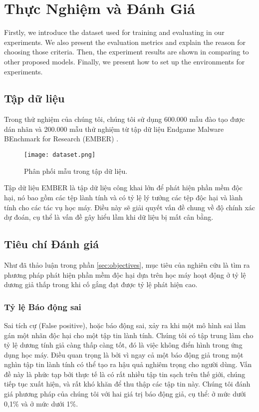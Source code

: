 \chapter{Thực Nghiệm và Đánh Giá}
\graphicspath{{Chapter5/Figs/}}

\begin{chapabstract}
Firstly, we introduce the dataset used for training and evaluating in our experiments. We also present the evaluation metrics and explain the reason for choosing those criteria. Then, the experiment results are shown in comparing to other proposed models. Finally, we present how to set up the environments for experiments.
\end{chapabstract}

\section{Tập dữ liệu}
\label{sec:dataset}

Trong thử nghiệm của chúng tôi, chúng tôi sử dụng 600.000 mẫu đào tạo được dán nhãn và 200.000 mẫu thử nghiệm từ tập dữ liệu Endgame Malware BEnchmark for Research (EMBER) \cite{anderson2018ember}.

\begin{figure}[H] 
\centering
\texttt{[image: dataset.png]}
\caption{Phân phối mẫu trong tập dữ liệu.}
\label{fig:ember}
\end{figure}
 
Tập dữ liệu EMBER là tập dữ liệu công khai lớn để phát hiện phần mềm độc hại, nó bao gồm các tệp lành tính và có tỷ lệ lý tưởng các tệp độc hại và lành tính cho các tác vụ học máy. Điều này sẽ giải quyết vấn đề chung về độ chính xác dự đoán, cụ thể là vấn đề gây hiểu lầm khi dữ liệu bị mất cân bằng.

\section{Tiêu chí Đánh giá}

Như đã thảo luận trong phần \ref{sec:objectives}, mục tiêu của nghiên cứu là tìm ra phương pháp phát hiện phần mềm độc hại dựa trên học máy hoạt động ở tỷ lệ dương giả thấp trong khi cố gắng đạt được tỷ lệ phát hiện cao.

\subsection{Tỷ lệ Báo động sai}

Sai tích cự (False positive), hoặc báo động sai, xảy ra khi một mô hình sai lầm gán một nhãn độc hại cho một tập tin lành tính. 
Chúng tôi có tập trung làm cho tỷ lệ dương tính giả càng thấp càng tốt, đó là việc không điển hình trong ứng dụng học máy. 
Điều quan trọng là bởi vì ngay cả một báo động giả trong một nghìn tập tin lành tính có thể tạo ra hậu quả nghiêm trọng cho người dùng. 
Vấn đề này là phức tạp bởi thực tế là có rất nhiều tập tin sạch trên thế giới, chúng tiếp tục xuất hiện, và rất khó khăn để thu thập các tập tin này. Chúng tôi đánh giá phương pháp của chúng tôi với hai giá trị báo động giả, cụ thể: ở mức dưới 0,1\% và ở mức dưới 1\%.

